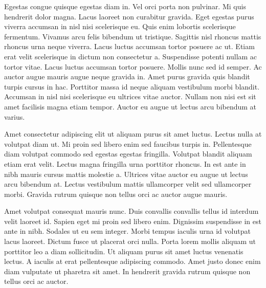 \documentclass[
  a4paper,
  spanish,
  12pt,
]{scrartcl}
\theoremstyle{ejercicio-style}
\theoremstyle{remark-style}
\begin{document}
Egestas congue quisque egestas diam in. Vel orci porta non pulvinar. Mi quis hendrerit dolor magna. Lacus laoreet non curabitur gravida. Eget egestas purus viverra accumsan in nisl nisi scelerisque eu. Quis enim lobortis scelerisque fermentum. Vivamus arcu felis bibendum ut tristique. Sagittis nisl rhoncus mattis rhoncus urna neque viverra. Lacus luctus accumsan tortor posuere ac ut. Etiam erat velit scelerisque in dictum non consectetur a. Suspendisse potenti nullam ac tortor vitae. Lacus luctus accumsan tortor posuere. Mollis nunc sed id semper. Ac auctor augue mauris augue neque gravida in. Amet purus gravida quis blandit turpis cursus in hac. Porttitor massa id neque aliquam vestibulum morbi blandit. Accumsan in nisl nisi scelerisque eu ultrices vitae auctor. Nullam non nisi est sit amet facilisis magna etiam tempor. Auctor eu augue ut lectus arcu bibendum at varius.

Amet consectetur adipiscing elit ut aliquam purus sit amet luctus. Lectus nulla at volutpat diam ut. Mi proin sed libero enim sed faucibus turpis in. Pellentesque diam volutpat commodo sed egestas egestas fringilla. Volutpat blandit aliquam etiam erat velit. Lectus magna fringilla urna porttitor rhoncus. In est ante in nibh mauris cursus mattis molestie a. Ultrices vitae auctor eu augue ut lectus arcu bibendum at. Lectus vestibulum mattis ullamcorper velit sed ullamcorper morbi. Gravida rutrum quisque non tellus orci ac auctor augue mauris.

Amet volutpat consequat mauris nunc. Duis convallis convallis tellus id interdum velit laoreet id. Sapien eget mi proin sed libero enim. Dignissim suspendisse in est ante in nibh. Sodales ut eu sem integer. Morbi tempus iaculis urna id volutpat lacus laoreet. Dictum fusce ut placerat orci nulla. Porta lorem mollis aliquam ut porttitor leo a diam sollicitudin. Ut aliquam purus sit amet luctus venenatis lectus. A iaculis at erat pellentesque adipiscing commodo. Amet justo donec enim diam vulputate ut pharetra sit amet. In hendrerit gravida rutrum quisque non tellus orci ac auctor.
\end{document}
